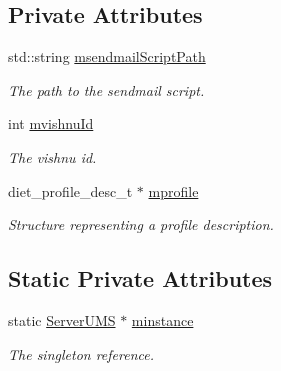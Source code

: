 \subsection*{Private Attributes}
\begin{DoxyCompactItemize}
\item 
\hypertarget{classServerUMS_afada4a5788f967573d0bebdd86fa27fc}{
std::string \hyperlink{classServerUMS_afada4a5788f967573d0bebdd86fa27fc}{msendmailScriptPath}}
\label{classServerUMS_afada4a5788f967573d0bebdd86fa27fc}

\begin{DoxyCompactList}\small\item\em The path to the sendmail script. \item\end{DoxyCompactList}\item 
\hypertarget{classServerUMS_aaa774476df0842c1c98bd03347c78f59}{
int \hyperlink{classServerUMS_aaa774476df0842c1c98bd03347c78f59}{mvishnuId}}
\label{classServerUMS_aaa774476df0842c1c98bd03347c78f59}

\begin{DoxyCompactList}\small\item\em The vishnu id. \item\end{DoxyCompactList}\item 
\hypertarget{classServerUMS_a6ef0b83c146414d0b277ebec2cb50747}{
diet\_\-profile\_\-desc\_\-t $\ast$ \hyperlink{classServerUMS_a6ef0b83c146414d0b277ebec2cb50747}{mprofile}}
\label{classServerUMS_a6ef0b83c146414d0b277ebec2cb50747}

\begin{DoxyCompactList}\small\item\em Structure representing a profile description. \item\end{DoxyCompactList}\end{DoxyCompactItemize}
\subsection*{Static Private Attributes}
\begin{DoxyCompactItemize}
\item 
\hypertarget{classServerUMS_a335a3efc65ca8b808598602338ee9a4d}{
static \hyperlink{classServerUMS}{ServerUMS} $\ast$ \hyperlink{classServerUMS_a335a3efc65ca8b808598602338ee9a4d}{minstance}}
\label{classServerUMS_a335a3efc65ca8b808598602338ee9a4d}

\begin{DoxyCompactList}\small\item\em The singleton reference. \item\end{DoxyCompactList}\end{DoxyCompactItemize}


